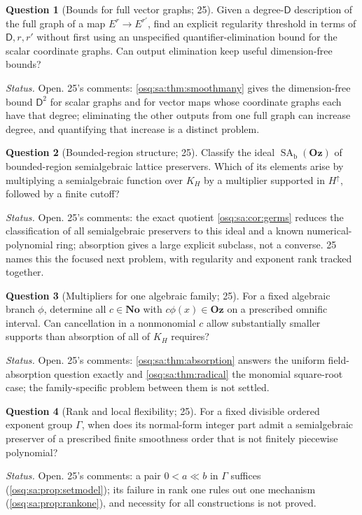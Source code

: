 \documentclass[11pt,letterpaper]{article}
\numberwithin{equation}{section}
\theoremstyle{definition}
\newtheorem{question}[question]{Question}
\theoremstyle{remark}
\theoremstyle{plain}
\newcommand{\No}{\mathbf{No}}
\newcommand{\Oz}{\mathbf{Oz}}
\begin{document}
\begin{question}[Bounds for full vector graphs; 25]\label{osq:sa:q:multireg}
Given a degree-$\mathsf D$ description of the full graph of a map $E^r\to E^{r'}$, find an explicit regularity threshold in terms of $\mathsf D,r,r'$ without
first using an unspecified quantifier-elimination bound for the scalar coordinate graphs. Can output elimination keep useful dimension-free bounds?
\end{question}
\emph{Status.} Open. 25's comments: \cref{osq:sa:thm:smoothmany} gives the dimension-free bound $\mathsf D^2$ for scalar graphs and for vector maps whose
coordinate graphs each have that degree; eliminating the other outputs from one full graph can increase degree, and quantifying that increase is a distinct
problem.

\begin{question}[Bounded-region structure; 25]\label{osq:sa:q:bounded}
Classify the ideal $\operatorname{SA}_{\mathrm b}(\Oz)$ of bounded-region semialgebraic lattice preservers. Which of its elements arise by multiplying a
semialgebraic function over $K_H$ by a multiplier supported in $H^{\uparrow}$, followed by a finite cutoff?
\end{question}
\emph{Status.} Open. 25's comments: the exact quotient \cref{osq:sa:cor:germs} reduces the classification of all semialgebraic preservers to this ideal
and a known numerical-polynomial ring; absorption gives a large explicit subclass, not a converse. 25 names this the focused next problem, with regularity
and exponent rank tracked together.

\begin{question}[Multipliers for one algebraic family; 25]\label{osq:sa:q:individual}
For a fixed algebraic branch $\phi$, determine all $c\in\No$ with $c\phi(x)\in\Oz$ on a prescribed omnific interval. Can cancellation in a nonmonomial $c$
allow substantially smaller supports than absorption of all of $K_H$ requires?
\end{question}
\emph{Status.} Open. 25's comments: \cref{osq:sa:thm:absorption} answers the uniform field-absorption question exactly and \cref{osq:sa:thm:radical} the
monomial square-root case; the family-specific problem between them is not settled.

\begin{question}[Rank and local flexibility; 25]\label{osq:sa:q:rank}
For a fixed divisible ordered exponent group $\Gamma$, when does its normal-form integer part admit a semialgebraic preserver of a prescribed finite
smoothness order that is not finitely piecewise polynomial?
\end{question}
\emph{Status.} Open. 25's comments: a pair $0<a\ll b$ in $\Gamma$ suffices (\cref{osq:sa:prop:setmodel}); its failure in rank one rules out one mechanism
(\cref{osq:sa:prop:rankone}), and necessity for all constructions is not proved.
\end{document}
